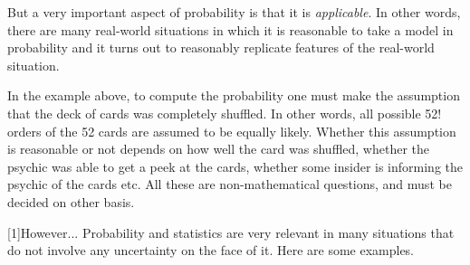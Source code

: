 \documentclass[preprint,  11pt]{amsart}
\theoremstyle{plain} %
\theoremstyle{definition} %
\begin{document}
But a very important aspect of probability is that it is {\em applicable}. In other words, there are many real-world situations in which it is reasonable to take a model in probability and it turns out to reasonably replicate features of  the real-world situation.

In the example above, to compute the probability one must make the assumption that the deck of cards was completely shuffled. In other words, all possible 52! orders of the 52 cards are assumed to be equally likely. Whether this assumption is reasonable or not depends on how well the card was shuffled, whether the psychic was able to get a peek at the cards, whether some insider is informing the psychic of the cards etc. All these are non-mathematical questions, and must be decided on other basis.

[1]{\vspace{4mm}However...} Probability and statistics are very relevant in many situations that do not involve any uncertainty on the face of it. Here are some examples.
\end{document}
